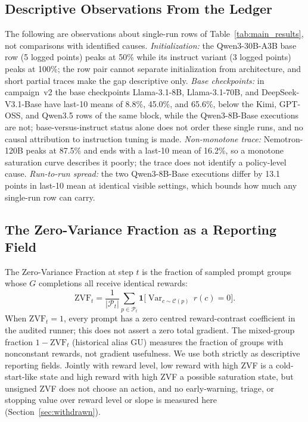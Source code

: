 \documentclass{article}
\begin{document}
\subsection{Descriptive Observations From the Ledger}
\label{sec:ledger_obs}
The following are observations about single-run rows of
Table~\ref{tab:main_results}, not comparisons with identified causes.
\emph{Initialization:} the Qwen3-30B-A3B base row (5 logged points) peaks at
50\% while its instruct variant (3 logged points) peaks at 100\%; the row pair
cannot separate initialization from architecture, and short partial traces make
the gap descriptive only. \emph{Base checkpoints:} in campaign~v2 the base
checkpoints Llama-3.1-8B, Llama-3.1-70B, and DeepSeek-V3.1-Base have last-10
means of 8.8\%, 45.0\%, and 65.6\%, below the Kimi, GPT-OSS, and Qwen3.5 rows
of the same block, while the Qwen3-8B-Base executions are not; base-versus-instruct
status alone does not order these single runs, and no causal attribution to
instruction tuning is made. \emph{Non-monotone trace:} Nemotron-120B peaks at 87.5\% and
ends with a last-10 mean of 16.2\%, so a monotone saturation curve describes it
poorly; the trace does not identify a policy-level cause. \emph{Run-to-run
spread:} the two Qwen3-8B-Base executions differ by 13.1 points in last-10 mean
at identical visible settings, which bounds how much any single-run row can
carry.

\subsection{The Zero-Variance Fraction as a Reporting Field}
\label{sec:zvf-analysis}

The Zero-Variance Fraction at step $t$ is the fraction of sampled prompt groups
whose $G$ completions all receive identical rewards:
\[
  \mathrm{ZVF}_t = \frac{1}{|\mathcal{P}_t|}\sum_{p \in \mathcal{P}_t}
  \mathbf{1}\bigl[\operatorname{Var}_{c \sim \mathcal{C}(p)}\,r(c) = 0\bigr].
\]
When $\mathrm{ZVF}_t = 1$, every prompt has a zero centred reward-contrast
coefficient in the audited runner; this does not assert a zero total gradient.
The mixed-group fraction $1-\mathrm{ZVF}_t$ (historical alias GU) measures the
fraction of groups with nonconstant rewards, not gradient usefulness. We use
both strictly as descriptive reporting fields. Jointly with reward level, low
reward with high ZVF is a cold-start-like state and high reward with high ZVF a
possible saturation state, but unsigned ZVF does not choose an action, and no
early-warning, triage, or stopping value over reward level or slope is
measured here (Section~\ref{sec:withdrawn}).
\end{document}
